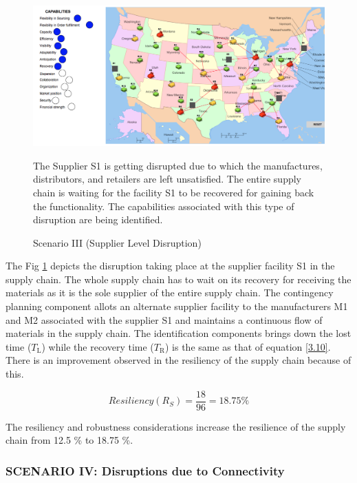 \begin{figure}[H]
  \centering
  \includegraphics[width=6.5in]{figures/pdf/S3SLD.png}\\
  \caption{Scenario III (Supplier Level Disruption)}
   {The Supplier S1 is getting disrupted due to which the manufactures, distributors, and retailers are left unsatisfied. The entire supply chain is waiting for the facility S1 to be recovered for gaining back the functionality. The capabilities associated with this type of disruption are being identified.}
  \label{S3SL}
\end{figure}   

The Fig \ref{S3SL} depicts the disruption taking place at the supplier facility S1 in the supply chain. The whole supply chain has to wait on its recovery for receiving the materials as it is the sole supplier of the entire supply chain. The contingency planning component allots an alternate supplier facility to the manufacturers M1 and M2 associated with the supplier S1 and maintains a continuous flow of materials in the supply chain. The identification components brings down the lost time ($T_{\text{L}}$) while the recovery time ($T_{\text{R}}$) is the same as that of equation \ref{3.10}. There is an improvement observed in the resiliency of the supply chain because of this.

\begin{equation}
    Resiliency(R_S) = \frac{18}{96} = 18.75 \% \label{3.25}
\end{equation}

The resiliency and robustness considerations increase the resilience of the supply chain from 12.5 \% to 18.75 \%.

\subsubsection{SCENARIO IV: Disruptions due to Connectivity}

